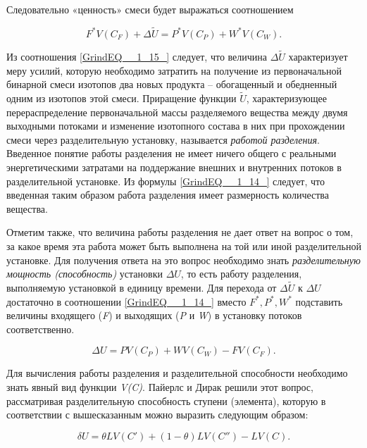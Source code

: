 Следовательно «ценность» смеси будет выражаться соотношением

\begin{equation}\label{GrindEQ__1_15_} 
F^{*} V(C_{F} )+\Delta \tilde{U}=P^{*} V(C_{P} )+W^{*} V(C_{W} ).      
\end{equation} 

Из соотношения \ref{GrindEQ__1_15_} следует, что величина $\Delta \tilde{U}$ характеризует меру усилий, которую необходимо затратить на получение из первоначальной бинарной смеси изотопов два новых продукта -- обогащенный и обедненный одним из изотопов этой смеси. Приращение функции $\tilde{U}$, характеризующее перераспределение первоначальной массы разделяемого вещества между двумя выходными потоками и изменение изотопного состава в них при прохождении смеси через разделительную установку, называется \textit{работой разделения}. Введенное понятие работы разделения не имеет ничего общего с реальными энергетическими затратами на поддержание внешних и внутренних потоков в разделительной установке. Из формулы \ref{GrindEQ__1_14_} следует, что введенная таким образом работа разделения имеет размерность количества вещества. 

 Отметим также, что величина работы разделения не дает ответ на вопрос о том, за какое время эта работа может быть выполнена на той или иной разделительной установке. Для получения ответа на это вопрос необходимо знать \textit{разделительную мощность (способность)} установки $\Delta U$, то есть работу разделения, выполняемую установкой в единицу времени. Для перехода от $\Delta \tilde{U}$ к $\Delta U$ достаточно в соотношении \ref{GrindEQ__1_14_} вместо $F^{*} ,P^{*} ,W^{*} $ подставить величины входящего (\textit{F}) и выходящих (\textit{P} и \textit{W}) в установку потоков соответственно.

\begin{equation} \label{GrindEQ__1_16_} 
\Delta U=PV(C_{P} )+WV(C_{W} )-FV(C_{F} ).     
\end{equation} 

Для вычисления работы разделения и разделительной способности необходимо знать явный вид функции \textit{V(C)}. Пайерлс и Дирак решили этот вопрос, рассматривая разделительную способность ступени (элемента), которую в соответствии с вышесказанным можно выразить следующим образом:

\begin{equation} \label{GrindEQ__1_17_} 
\delta U=\theta LV(C')+(1-\theta )LV(C'')-LV(C).   
\end{equation} 

